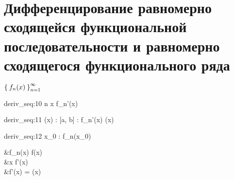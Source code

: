 \section{Дифференцирование равномерно сходящейся функциональной последовательности и равномерно сходящегося функционального ряда}

\begin{theorem}
	$ \Set{f_n(x)}_{n=1}^{\infty} $
	\begin{equ}{deriv_seq:10}
		\forall n \quad \forall x \in [a, b] \quad \exist f_n'(x)
	\end{equ}
	\begin{equ}{deriv_seq:11}
		\exist \vphi(x) : [a, b]  \to \R : \quad f_n'(x)  \vphi(x)
	\end{equ}
	\begin{equ}{deriv_seq:12}
		\exist x_0 \in [a, b] : \quad \exist {} f_n(x_0) \in \R
	\end{equ}
	\begin{mequ}
		&f_n(x)  f(x) \\
		 &\forall x \in [a, b] \quad \exist f'(x) \\
		 &f'(x) = \vphi(x)
	\end{mequ}
\end{theorem}

